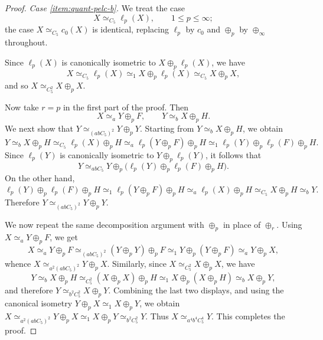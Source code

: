 \documentclass[10pt,a4paper]{amsart}
\renewcommand{\le}{\leqslant}
\begin{document}
\begin{proof}
\smallskip
\noindent
\textit{Case \ref{item:quant-pelc-b}.}
We treat the case
\[
    X \simeq_{C_5} \ell_p(X),
    \qquad 1 \le p \le \infty;
\]
the case $X \simeq_{C_5} c_0(X)$ is identical, replacing $\ell_p$ by $c_0$ and $\oplus_p$ by $\oplus_\infty$ throughout.

Since $\ell_p(X)$ is canonically isometric to $X \oplus_p \ell_p(X)$, we have
\[
    X \simeq_{C_5} \ell_p(X)
    \simeq_1 X \oplus_p \ell_p(X)
    \simeq_{C_5} X \oplus_p X,
\]
and so
\(
    X \simeq_{C_5^2} X \oplus_p X.
\)

Now take $r=p$ in the first part of the proof.
Then
\[
    X \simeq_a Y \oplus_p F,
    \qquad
    Y \simeq_b X \oplus_p H.
\]
We next show that
\(
    Y \simeq_{(abC_5)^2} Y \oplus_p Y.
\)
Starting from $Y \simeq_b X \oplus_p H$, we obtain
\[
    Y \simeq_b X \oplus_p H
    \simeq_{C_5} \ell_p(X)\oplus_p H
    \simeq_a \ell_p(Y \oplus_p F)\oplus_p H
    \simeq_1 \ell_p(Y)\oplus_p \ell_p(F)\oplus_p H.
\]
Since $\ell_p(Y)$ is canonically isometric to $Y \oplus_p \ell_p(Y)$, it follows that
\[
    Y \simeq_{abC_5} Y \oplus_p \bigl(\ell_p(Y)\oplus_p \ell_p(F)\oplus_p H\bigr).
\]
On the other hand,
\[
    \ell_p(Y)\oplus_p \ell_p(F)\oplus_p H
    \simeq_1 \ell_p(Y \oplus_p F)\oplus_p H
    \simeq_a \ell_p(X)\oplus_p H
    \simeq_{C_5} X \oplus_p H
    \simeq_b Y.
\]
Therefore
\(
    Y \simeq_{(abC_5)^2} Y \oplus_p Y.
\)

We now repeat the same decomposition argument with $\oplus_p$ in place of $\oplus_r$.
Using $X \simeq_a Y \oplus_p F$, we get
\[
    X \simeq_a Y \oplus_p F
    \simeq_{(abC_5)^2} (Y \oplus_p Y)\oplus_p F
    \simeq_1 Y \oplus_p (Y \oplus_p F)
    \simeq_a Y \oplus_p X,
\]
whence
\(
    X \simeq_{a^2(abC_5)^2} Y \oplus_p X.
\)
Similarly, since $X \simeq_{C_5^2} X \oplus_p X$, we have
\[
    Y \simeq_b X \oplus_p H
    \simeq_{C_5^2} (X \oplus_p X)\oplus_p H
    \simeq_1 X \oplus_p (X \oplus_p H)
    \simeq_b X \oplus_p Y,
\]
and therefore
\(
    Y \simeq_{b^2C_5^2} X \oplus_p Y.
\)
Combining the last two displays, and using the canonical isometry $Y \oplus_p X \simeq_1 X \oplus_p Y$, we obtain
\(
    X \simeq_{a^2(abC_5)^2} Y \oplus_p X
    \simeq_1 X \oplus_p Y
    \simeq_{b^2C_5^2} Y.
\)
Thus $X \simeq_{a^4b^4C_5^4} Y$.
This completes the proof.
\end{proof}
\end{document}
